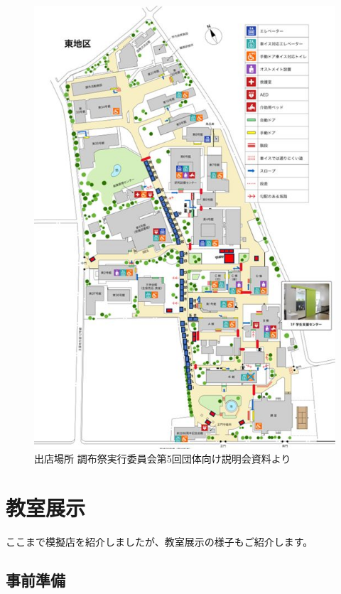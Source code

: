 \documentclass[../super_nova_20yy]{subfiles}
\begin{document}
\begin{figure}[H]
  \centering
  \includegraphics[width=\columnwidth]{画像5.jpg}
  \caption{出店場所 調布祭実行委員会第5回団体向け説明会資料より}
  \label{fig:5}
\end{figure}

\section{教室展示}

ここまで模擬店を紹介しましたが、教室展示の様子もご紹介します。

\subsection{事前準備}
\end{document}
